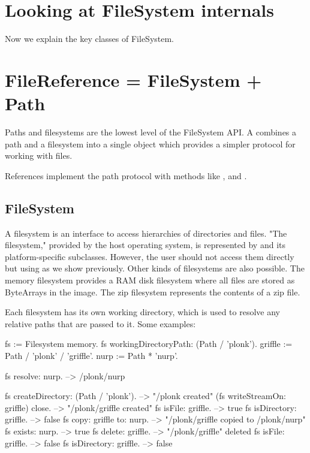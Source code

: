 \documentclass[a4paper,10pt,twoside]{book}
\begin{document}
\section{Looking at FileSystem internals}
Now we explain the key classes of FileSystem. 

\section{FileReference = FileSystem + Path}
Paths and filesystems are the lowest level of the FileSystem API. A  combines a path and a filesystem into a single object which provides a simpler protocol for working with files.


References implement the path protocol with methods like \ct{/},  and .


\subsection{FileSystem}

A filesystem is an interface to access hierarchies of directories and files. "The filesystem," provided by the host operating system, is represented by  and its platform-specific subclasses. However, the user should not access them directly but using  as we show previously. Other kinds of filesystems are also possible. The memory filesystem provides a RAM disk filesystem where all files are stored as ByteArrays in the image. The zip filesystem represents the contents of a zip file.

Each filesystem has its own working directory, which is used to resolve any relative paths that are passed to it. Some examples:

\begin{code}{}
fs := Filesystem memory.
fs workingDirectoryPath: (Path / 'plonk').
griffle := Path / 'plonk' / 'griffle'.
nurp := Path * 'nurp'.
    
fs resolve: nurp.            --> /plonk/nurp
    
fs createDirectory: (Path / 'plonk').  --> "/plonk created"
(fs writeStreamOn: griffle) close.  --> "/plonk/griffle created"
fs isFile: griffle.         --> true
fs isDirectory: griffle.         --> false
fs copy: griffle to: nurp.       --> "/plonk/griffle copied to /plonk/nurp"
fs exists: nurp.             --> true
fs delete: griffle.          --> "/plonk/griffle" deleted
fs isFile: griffle.          --> false
fs isDirectory: griffle.         --> false
\end{code}
	
\end{document}
